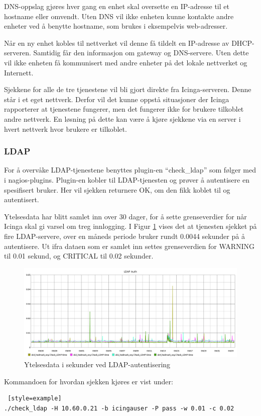 DNS-oppslag gjøres hver gang en enhet skal oversette en IP-adresse til et hostname eller omvendt. Uten DNS vil ikke enheten kunne kontakte andre enheter ved å benytte hostname, som brukes i eksempelvis web-adresser\cite{dns}. 

Når en ny enhet kobles til nettverket vil denne få tildelt en IP-adresse av DHCP-serveren. Samtidig får den informasjon om gateway og DNS-servere. Uten dette vil ikke enheten få kommunisert med andre enheter på det lokale nettverket og Internett\cite{dhcp}.

Sjekkene for alle de tre tjenestene vil bli gjort direkte fra Icinga-serveren. Denne står i et eget nettverk. Derfor vil det kunne oppstå situasjoner der Icinga rapporterer at tjenestene fungerer, men det fungerer ikke for brukere tilkoblet andre nettverk. En løsning på dette kan være å kjøre sjekkene via en server i hvert nettverk hvor brukere er tilkoblet.

\subsubsection*{LDAP}
For å overvåke LDAP-tjenestene benyttes plugin-en ``check\_ldap'' som følger med i nagios-plugins. Plugin-en kobler til LDAP-tjenesten og prøver å autentisere en spesifisert bruker. Her vil sjekken returnere OK, om den fikk koblet til og autentisert. 

Ytelsesdata har blitt samlet inn over 30 dager, for å sette grenseverdier for når Icinga skal gi varsel om treg innlogging. I Figur \ref{ldapauth-inv} vises det at tjenesten sjekket på fire LDAP-servere, over en måneds periode bruker rundt 0.0044 sekunder på å autentisere. Ut ifra dataen som er samlet inn settes grenseverdien for WARNING til 0.01 sekund, og CRITICAL til 0.02 sekunder.

\begin{figure}[H]
    \centering
    \includegraphics[width=1.0\textwidth]{img/ldap-auth-inv}
    \caption{Ytelsesdata i sekunder ved LDAP-autentisering}
    \label{ldapauth-inv}
\end{figure}
Kommandoen for hvordan sjekken kjøres er vist under:
\begin{lstlisting} [style=example]
./check_ldap -H 10.60.0.21 -b icingauser -P pass -w 0.01 -c 0.02
\end{lstlisting}

